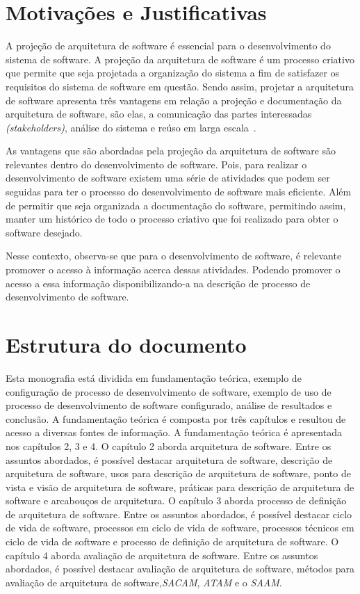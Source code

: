 \section{Motivações e Justificativas}

A projeção de arquitetura de software é essencial para o desenvolvimento do sistema de software. A projeção da arquitetura de software é um processo criativo que permite que seja projetada a organização do sistema a fim de satisfazer os requisitos do sistema de software em questão. Sendo assim, projetar a arquitetura de software apresenta três vantagens em relação a projeção e documentação da arquitetura de software, são elas, a comunicação das partes interessadas \emph{(stakeholders)}, análise do sistema e reúso em larga escala~\cite{Sommerville_2011_texbook}.

As vantagens que são abordadas pela projeção da arquitetura de software são relevantes dentro do desenvolvimento de software. Pois, para realizar o desenvolvimento de software existem uma série de atividades que podem ser seguidas para ter o processo do desenvolvimento de software mais eficiente. Além de permitir que seja organizada a documentação do software, permitindo assim, manter um histórico de todo o processo criativo que foi realizado para obter o software desejado.

Nesse contexto, observa-se que para o desenvolvimento de software, é relevante promover o acesso à informação acerca dessas atividades. Podendo promover o acesso a essa informação disponibilizando-a na descrição de processo de desenvolvimento de software.

\section{Estrutura do documento}

Esta monografia está dividida em fundamentação teórica, exemplo de configuração de processo de desenvolvimento de software, exemplo de uso de processo de desenvolvimento de software configurado, análise de resultados e conclusão. A fundamentação teórica é composta por três capítulos e resultou de acesso a diversas fontes de informação. A fundamentação teórica é apresentada nos capítulos 2, 3 e 4. O capítulo 2 aborda arquitetura de software. Entre os assuntos abordados, é possível destacar arquitetura de software, descrição de arquitetura de software, usos para descrição de arquitetura de software, ponto de vista e visão de arquitetura de software, práticas para descrição de arquitetura de software e arcabouços de arquitetura. O capítulo 3 aborda processo de definição de arquitetura de software. Entre os assuntos abordados, é possível destacar ciclo de vida de software, processos em ciclo de vida de software, processos técnicos em ciclo de vida de software e processo de definição de arquitetura de software. O capítulo  4 aborda avaliação de arquitetura de software. Entre os assuntos abordados, é possível destacar avaliação de arquitetura de software, métodos para avaliação de arquitetura de software,\emph{\acrfull{SACAM}}, \emph{\acrfull{ATAM}} e o \emph{\acrfull{SAAM}}. 

